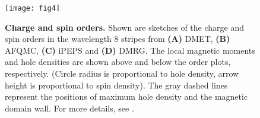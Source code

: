 \documentclass[12pt]{article}
\begin{document}
\begin{figure}[htpb]
  \centering
  \texttt{[image: fig4]}

  \caption{{\bf Charge and spin orders.} Shown are sketches of the charge and spin orders in the wavelength 8 stripes from {\bf(A)} DMET, {\bf(B)} AFQMC, {\bf(C)} iPEPS and {\bf(D)} DMRG. The local magnetic moments and hole densities are shown above and below   the order plots, respectively. (Circle radius is proportional to hole density, arrow height is proportional to spin density). The gray dashed lines represent the positions of maximum hole density and the magnetic domain wall. For more details, see \cite{supplementary}.}
  \label{fig:stripes}
\end{figure}


\end{document}
